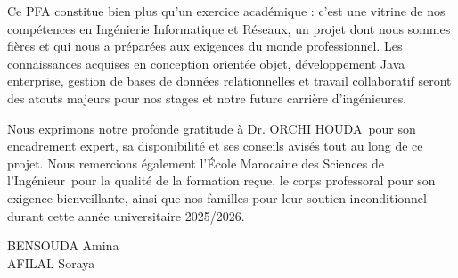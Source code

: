 \documentclass[11pt,a4paper,oneside]{report}
\newcommand{\anneeuniv}{2025/2026}
\newcommand{\etudianteun}{BENSOUDA Amina}
\newcommand{\etudiantedeux}{AFILAL Soraya}
\newcommand{\encadrante}{Dr. ORCHI HOUDA}
\newcommand{\ecole}{École Marocaine des Sciences de l'Ingénieur}
\newcommand{\filiere}{Ingénierie Informatique et Réseaux}
\begin{document}
Ce PFA constitue bien plus qu'un exercice académique : c'est une vitrine de nos compétences en \filiere, un projet dont nous sommes fières et qui nous a préparées aux exigences du monde professionnel. Les connaissances acquises en conception orientée objet, développement Java enterprise, gestion de bases de données relationnelles et travail collaboratif seront des atouts majeurs pour nos stages et notre future carrière d'ingénieures.

Nous exprimons notre profonde gratitude à \encadrante\ pour son encadrement expert, sa disponibilité et ses conseils avisés tout au long de ce projet. Nous remercions également l'\ecole\ pour la qualité de la formation reçue, le corps professoral pour son exigence bienveillante, ainsi que nos familles pour leur soutien inconditionnel durant cette année universitaire \anneeuniv.

\vspace{1cm}
\begin{flushright}
    \etudianteun\\
    \etudiantedeux
\end{flushright}
\end{document}
